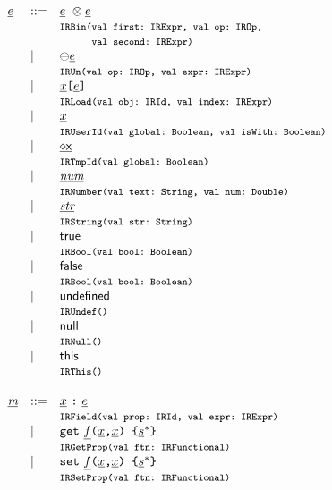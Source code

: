 \[\begin{array}{llll}
\ir\expr &::=&
 \irexpr \ \inop \irexpr \\
&& \mtt{IRBin(val first:~IRExpr, val op:~IROp,}\\
&& \mtt{\phantom{IRBin(}val second:~IRExpr)}\\
 &\mid& \preop \irexpr \\
&& \mtt{IRUn(val op:~IROp, val expr:~IRExpr)}\\
 &\mid& \irid\verb+[+\ir\expr\verb+]+ \\
&& \mtt{IRLoad(val obj:~IRId, val index:~IRExpr)}\\
 &\mid& \irid\\
&& \mtt{IRUserId(val global:~Boolean, val isWith:~Boolean)}\\
 &\mid& \newvar{x}\\
&& \mtt{IRTmpId(val global:~Boolean)}\\
 &\mid& \ir\num \\
&& \mtt{IRNumber(val text:~String, val num:~Double)}\\
 &\mid& \ir\str \\
&& \mtt{IRString(val str:~String)}\\
 &\mid& {\sf true} \\
&& \mtt{IRBool(val bool:~Boolean)}\\
 &\mid& {\sf false} \\
&& \mtt{IRBool(val bool:~Boolean)}\\
 &\mid& {\sf undefined} \\
&& \mtt{IRUndef()}\\
 &\mid& {\sf null} \\
&& \mtt{IRNull()}\\
 &\mid& {\sf this} \\
&& \mtt{IRThis()}\\\\

\ir\member &::=& \irid \ \verb+:+ \ \irexpr\\
&& \mtt{IRField(val prop:~IRId, val expr:~IRExpr)}\\
 &\mid& {\tt get}\ \ir{f} \verb+(+\irid\verb+,+\irid\verb+) {+ \ir\stmt^* \verb+}+\\
&&\mtt{IRGetProp(val ftn:~IRFunctional)}\\
 &\mid& {\tt set}\ \ir{f} \verb+(+\irid\verb+,+\irid\verb+) {+ \ir\stmt^* \verb+}+\\
&&\mtt{IRSetProp(val ftn:~IRFunctional)}\\

\end{array}
\]

